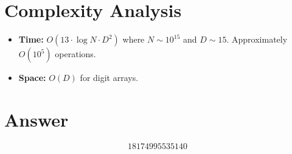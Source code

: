 \documentclass[12pt]{article}
\begin{document}
\section{Complexity Analysis}
\begin{itemize}
    \item \textbf{Time:} $O(13 \cdot \log N \cdot D^2)$ where $N \sim 10^{15}$ and $D \sim 15$. Approximately $O(10^5)$ operations.
    \item \textbf{Space:} $O(D)$ for digit arrays.
\end{itemize}

\section{Answer}

\[
\boxed{18174995535140}
\]
\end{document}
